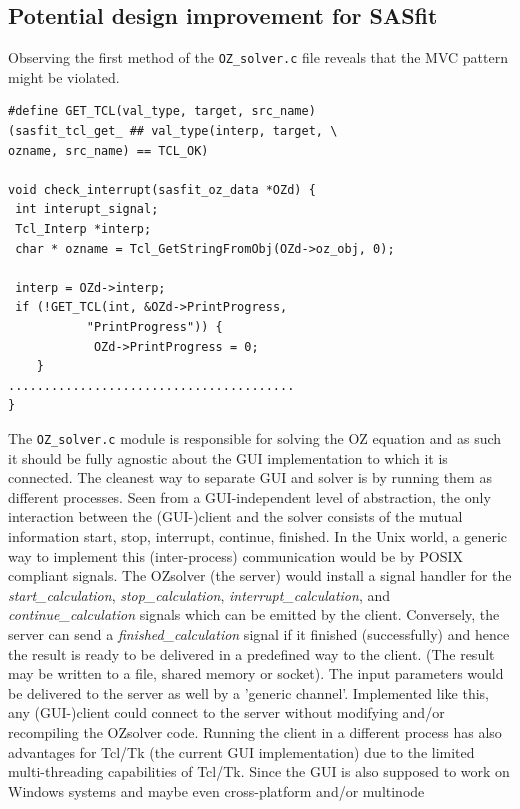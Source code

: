 \documentclass[11pt,a4paper]{article}
\begin{document}
\subsection{Potential design improvement for SASfit}
Observing the first method of the \texttt{OZ\_solver.c} file reveals that the MVC pattern might be violated. 
\lstset{language=C}
\begin{lstlisting}[frame=single]  
#define GET_TCL(val_type, target, src_name) 
(sasfit_tcl_get_ ## val_type(interp, target, \
ozname, src_name) == TCL_OK)

void check_interrupt(sasfit_oz_data *OZd) {
 int interupt_signal;
 Tcl_Interp *interp;
 char * ozname = Tcl_GetStringFromObj(OZd->oz_obj, 0);

 interp = OZd->interp;
 if (!GET_TCL(int, &OZd->PrintProgress, 
           "PrintProgress")) {
            OZd->PrintProgress = 0;
    }
........................................
}
\end{lstlisting}
The \texttt{OZ\_solver.c} module is responsible for solving the OZ equation and as such it should be fully agnostic about
the GUI implementation to which it is connected. The cleanest way to separate GUI and solver is by running them 
as different processes. Seen from a GUI-independent level of abstraction, the only interaction between
the (GUI-)client and the solver consists of the mutual information start, stop, interrupt, continue, finished. In the Unix world, a generic way
to implement this (inter-process) communication would be by POSIX compliant signals. The OZsolver (the server) would install
a signal handler for the \textit{start\_calculation}, \textit{stop\_calculation}, \textit{interrupt\_calculation}, and \textit{continue\_calculation}
signals which can be emitted by the client. Conversely, the server can send a \textit{finished\_calculation} signal if it finished (successfully) and 
hence the result is ready to be delivered in a predefined way to the client. (The result may be written to a file, shared memory or socket). 
The input parameters would be delivered to the server as well by a 'generic channel'. \newline
Implemented like this, any (GUI-)client could connect to the server without modifying and/or recompiling the OZsolver code.
Running the client in a different process has also advantages for Tcl/Tk (the current GUI implementation) due to the 
limited multi-threading capabilities of Tcl/Tk. \newline
Since the GUI is also supposed to work on Windows systems and maybe even cross-platform and/or multinode
\end{document}

